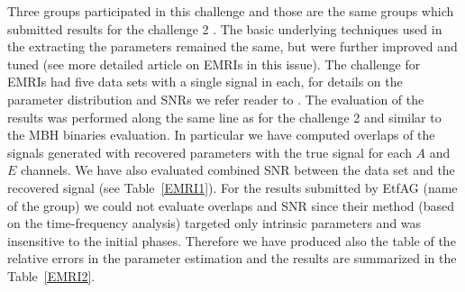\documentclass{iopart}
\begin{document}
Three groups participated in this challenge and those are the same groups which 
submitted results for the challenge 2 \cite{mldcgwdaw2}. The basic underlying techniques 
used in the extracting the parameters remained the same, but were further 
improved and tuned (see more detailed article on EMRIs in this issue).
The challenge for EMRIs had five data sets with a single signal in each, for details on the 
parameter distribution and SNRs we refer reader to \cite{mldcgwdaw2}. The evaluation of the 
results was performed along the same line as for the challenge 2 and similar to the MBH binaries 
evaluation. In particular we have computed overlaps of the signals generated with recovered 
parameters with the true signal for each $A$ and $E$ channels. We have also evaluated 
combined SNR between the data set and the recovered signal (see Table~\ref{EMRI1}).
 For the results submitted by EtfAG (name of the group) we could not evaluate overlaps and 
 SNR since their method (based on the time-frequency analysis) targeted only intrinsic parameters and was insensitive to the initial phases. Therefore we have produced also the table of the relative errors in the parameter estimation and the results are summarized in the 
 Table~\ref{EMRI2}.
 
\end{document}

